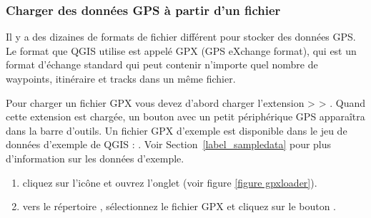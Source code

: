 \subsubsection{Charger des données GPS à partir d'un fichier}\label{label_loadgps}

Il y a des dizaines de formats de fichier différent pour stocker des données
GPS.
Le format que QGIS utilise est appelé GPX (GPS eXchange format), qui est un format d'échange standard qui peut contenir n'importe quel nombre de waypoints, itinéraire et tracks dans un même fichier.

Pour charger un fichier GPX vous devez d'abord charger l'extension  >  > . Quand cette extension est chargée, un bouton avec un petit périphérique GPS apparaîtra dans la barre d'outils. Un fichier GPX d'exemple est disponible dans le jeu de données d'exemple de QGIS :
. Voir Section~\ref{label_sampledata} pour plus d'information sur les données d'exemple.

\begin{enumerate}
\item cliquez sur l'icône  et ouvrez l'onglet  (voir figure \ref{figure gpxloader}).
\item {} vers le répertoire , sélectionnez le fichier GPX  et cliquez sur le bouton .
\end{enumerate}

